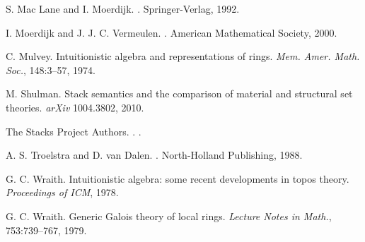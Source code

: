 \documentclass[10pt,utf8,notheorems,compress]{beamer}
\newcommand{\?}{\,{:}\,}
\renewcommand{\_}{\mathpunct{.}\,}
\newcommand{\backupend}{
  \addtocounter{framenumbervorappendix}{-\value{framenumber}}
  \addtocounter{framenumber}{\value{framenumbervorappendix}} 
}
\begin{document}
{\begin{thebibliography}{18}
      S. Mac Lane and I. Moerdijk.
      .
      \newblock Springer-Verlag, 1992.

      I. Moerdijk and J. J. C. Vermeulen.
      .
      \newblock American Mathematical Society, 2000.

      C. Mulvey.
      \newblock Intuitionistic algebra and representations of rings.
      \newblock \emph{Mem. Amer. Math. Soc.}, 148:3--57, 1974.

      M. Shulman.
      \newblock Stack semantics and the comparison of material and structural set theories.
      \newblock \emph{arXiv} 1004.3802, 2010.

      The Stacks Project Authors.
      .
      .

      A. S. Troelstra and D. van Dalen.
      .
      \newblock North-Holland Publishing, 1988.

      G. C. Wraith.
      \newblock Intuitionistic algebra: some recent developments in topos theory.
      \newblock \emph{Proceedings of ICM}, 1978.

      G. C. Wraith.
      \newblock Generic Galois theory of local rings.
      \newblock \emph{Lecture Notes in Math.}, 753:739--767, 1979.
  \end{thebibliography}
}
\backupend





\end{document}
